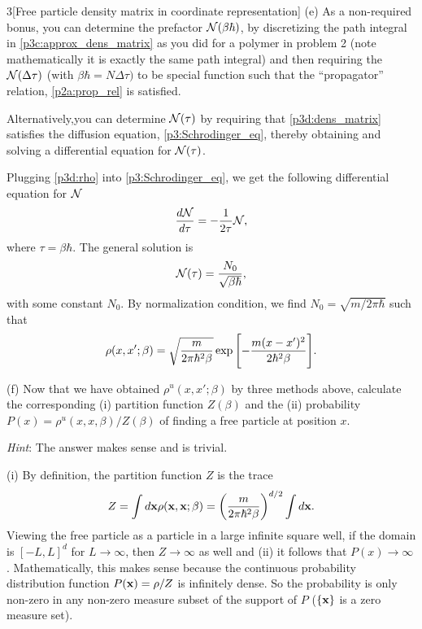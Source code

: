 \documentclass[12pt]{article}
\begin{document}
\begin{problem}{3}[Free particle density matrix in coordinate representation]
(e) As a non-required bonus, you can determine the prefactor $\mathcal{N}(\beta\hbar)$,
by discretizing the path integral in \eqref{p3c:approx_dens_matrix} as you did
for a polymer in problem 2 (note mathematically it is exactly the same path
integral) and then requiring the $\mathcal{N}(\Delta\tau)$ (with
$\beta\hbar=N\Delta\tau)$ to be special function such that the ``propagator''
relation, \eqref{p2a:prop_rel} is satisfied.

Alternatively,you can determine $\mathcal{N}(\tau)$ by requiring that
\eqref{p3d:dens_matrix} satisfies the diffusion equation,
\eqref{p3:Schrodinger_eq}, thereby obtaining and solving a differential equation
for $\mathcal{N}(\tau)$.
\begin{solution}
Plugging \eqref{p3d:rho} into \eqref{p3:Schrodinger_eq}, we get the following 
differential equation for $\mathcal{N}$
\begin{equation}
    \frac{d\mathcal{N}}{d\tau}=-\frac{1}{2\tau}\mathcal{N} ,
\end{equation}
where $\tau=\beta\hbar$. The general solution is
\begin{equation}
    \mathcal{N}(\tau)=\frac{N_0}{\sqrt{\beta\hbar}} ,
\end{equation}
with some constant $N_0$. By normalization condition, we find
$N_0=\sqrt{m/2\pi\hbar}$ such that
\begin{equation}
    \rho(x,x';\beta)=\sqrt{\frac{m}{2\pi\hbar^2\beta}}\exp\qty[-\frac{m(x-x')^2}{2\hbar^2\beta}]. 
\end{equation}
\end{solution}

(f) Now that we have obtained $\rho^u(x,x';\beta)$ by three methods above,
calculate the corresponding (i) partition function $Z(\beta)$ and the (ii)
probability $P(x)=\rho^u(x,x,\beta)/Z(\beta)$ of finding a free particle at
position $x$.

\textit{Hint}: The answer makes sense and is trivial.
\begin{solution}
(i) By definition, the partition function $Z$ is the trace
\begin{equation}
    Z=\int
    d\vb{x}\rho(\vb{x},\vb{x};\beta)=\qty(\frac{m}{2\pi\hbar^2\beta})^{d/2}\int
    d\vb{x}.
\end{equation}
Viewing the free particle as a particle in a large infinite square well, if the 
domain is $[-L,L]^d$ for $L\to\infty$, then $Z\to\infty$ as well and
(ii) it follows that $P(x)\to\infty$. Mathematically, this makes sense because
the continuous probability distribution function $P(\vb{x})=\rho/Z$ is 
infinitely dense. So the probability is only non-zero in any non-zero measure
subset of the support of $P$ ($\qty{\vb{x}}$ is a zero measure set).


\end{solution}
\end{problem}
\end{document}
